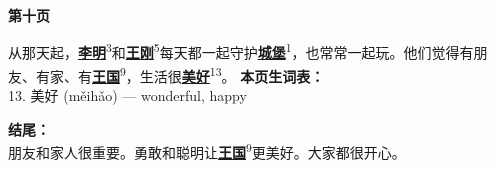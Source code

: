 \documentclass[20pt]{extarticle}
\newcommand{\glossedword}[2]{\uline{\textbf{#1}}\textsuperscript{#2}}
\begin{document}
\begin{center}
    {\fontsize{36}{44}\selectfont \textbf{第十页}}
\end{center}
\vspace{2em}
{\fontsize{22}{30}\selectfont
\noindent
从那天起，\glossedword{李明}{3}和\glossedword{王刚}{5}每天都一起守护\glossedword{城堡}{1}，也常常一起玩。他们觉得有朋友、有家、有\glossedword{王国}{9}，生活很\glossedword{美好}{13}。
}
\vfill
{\fontsize{18}{26}\selectfont
\noindent
\textbf{本页生词表：}\\[0.5em]
13. 美好 (měihǎo) — wonderful, happy
}

\vfill
{\fontsize{20}{28}\selectfont
\noindent
\textbf{结尾：}\\
朋友和家人很重要。勇敢和聪明让\glossedword{王国}{9}更美好。大家都很开心。
}
\end{document}
